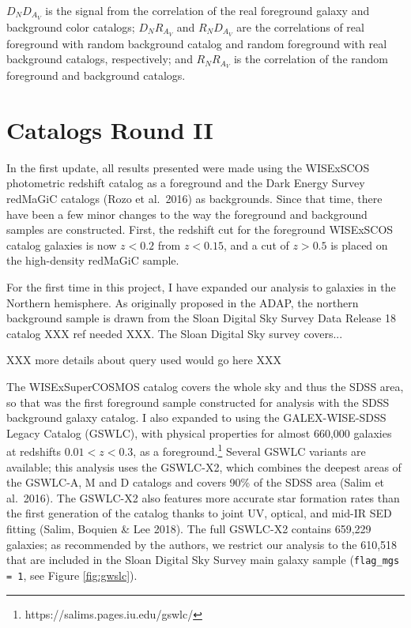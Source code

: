 \documentclass[11pt, oneside]{article}   	%
\begin{document}
$D_N D_{A_V}$ is the signal from the correlation of the real foreground galaxy and background color catalogs; $D_N R_{A_V}$ and $R_N D_{A_V}$ are the correlations of real foreground with random background catalog and random foreground with real background catalogs, respectively; and $R_N R_{A_V}$ is the correlation of the random foreground and background catalogs. 



\section{Catalogs Round II}\label{sec:catalogs}
In the first update, all results presented were made using the WISExSCOS photometric redshift catalog as a foreground and the Dark Energy Survey redMaGiC catalogs (Rozo et al.~2016) as backgrounds. Since that time, there have been a few minor changes to the way the foreground and background samples are constructed. First, the redshift cut for the foreground WISExSCOS catalog galaxies is now $z < 0.2$ from $z < 0.15$, and a cut of $z > 0.5$ is placed on the high-density redMaGiC sample. 

For the first time in this project, I have expanded our analysis to galaxies in the Northern hemisphere. As originally proposed in the ADAP, the northern background sample is drawn from the Sloan Digital Sky Survey Data Release 18 catalog XXX ref needed XXX. The Sloan Digital Sky survey covers...

XXX more details about query used would go here XXX 

The WISExSuperCOSMOS catalog covers the whole sky and thus the SDSS area, so that was the first foreground sample constructed for analysis with the SDSS background galaxy catalog. I also expanded to using the GALEX-WISE-SDSS Legacy Catalog (GSWLC), with physical properties for almost 660,000 galaxies at redshifts $0.01 < z < 0.3$, as a foreground.\footnote{https://salims.pages.iu.edu/gswlc/} Several GSWLC variants are available; this analysis uses the GSWLC-X2, which combines the deepest areas of the GSWLC-A, M and D catalogs and covers 90\% of the SDSS area (Salim et al.~2016). The GSWLC-X2 also features more accurate star formation rates than the first generation of the catalog thanks to joint UV, optical, and mid-IR SED fitting (Salim, Boquien \& Lee 2018). The full GSWLC-X2 contains 659,229 galaxies; as recommended by the authors, we restrict our analysis to the 610,518 that are included in the Sloan Digital Sky Survey main galaxy sample (\texttt{flag\_mgs = 1}, see Figure \ref{fig:gwslc}). 
\end{document}
